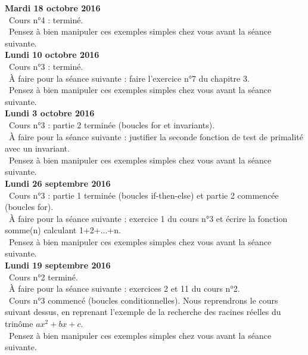 \documentclass[12pt,a4paper]{article}
\begin{document}
\noindent\textbf{Mardi 18 octobre 2016 }\\
\bu\ Cours n°4 : terminé. \\
\bu\ Pensez à bien manipuler ces exemples simples chez vous avant la séance suivante. \vspace{.4cm}\\

\noindent\textbf{Lundi 10 octobre 2016 }\\
\bu\ Cours n°3 : terminé. \\
\bu\ À faire pour la séance suivante : faire l'exercice n°7 du chapitre 3. \\
\bu\ Pensez à bien manipuler ces exemples simples chez vous avant la séance suivante. \vspace{.4cm}\\

\noindent\textbf{Lundi 3 octobre 2016 }\\
\bu\ Cours n°3 : partie 2 terminée (boucles for et invariants). \\
\bu\ À faire pour la séance suivante : justifier la seconde fonction de test de primalité avec un invariant. \\
\bu\ Pensez à bien manipuler ces exemples simples chez vous avant la séance suivante. \vspace{.4cm}\\

\noindent\textbf{Lundi 26 septembre 2016 }\\
\bu\ Cours n°3 : partie 1 terminée (boucles if-then-else) et partie 2 commencée (boucles for). \\
\bu\ À faire pour la séance suivante : exercice 1 du cours n°3 et écrire la fonction somme(n) calculant 1+2+...+n. \\
\bu\ Pensez à bien manipuler ces exemples simples chez vous avant la séance suivante. \vspace{.4cm}\\


\noindent\textbf{Lundi 19 septembre 2016 }\\
\bu\ Cours n°2 terminé. \\
\bu\ À faire pour la séance suivante : exercices 2 et 11 du cours n°2. \\
\bu\ Cours n°3 commencé (boucles conditionnelles). Nous reprendrons le cours suivant dessus, en reprenant l'exemple de la recherche des racines réelles du trinôme $ax^2+bx+c$. \\
\bu\ Pensez à bien manipuler ces exemples simples chez vous avant la séance suivante. \vspace{.4cm}\\
\end{document}
